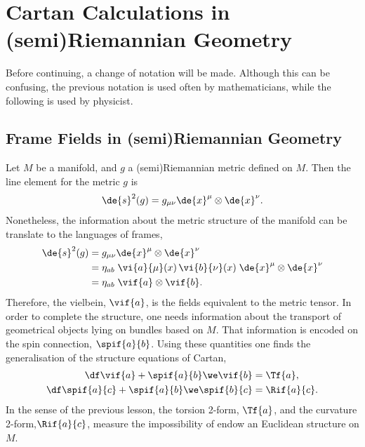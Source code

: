 
\chapter{Cartan Calculations in (semi)Riemannian Geometry}

Before continuing, a change of notation will be made. Although this can be confusing, the previous notation is used often by mathematicians, while the following is used by physicist.

\section{Frame Fields in (semi)Riemannian Geometry}


Let $M$ be a manifold, and $g$ a (semi)Riemannian metric defined on $M$. Then the line element for the metric $g$ is
\begin{align}
  \de{s}^2(g) = g_{\mu\nu} \de{x}^\mu \otimes \de{x}^\nu.
\end{align}
Nonetheless, the information about the metric structure of the manifold can be translate to the languages of frames,
\begin{equation}
  \begin{split}
    \de{s}^2(g)
    &= g_{\mu\nu} \de{x}^\mu \otimes \de{x}^\nu \\
    &= \eta_{ab} \; \vi{a}{\mu}(x) \, \vi{b}{\nu}(x) \; \de{x}^\mu \otimes \de{x}^\nu \\
    &= \eta_{ab} \; \vif{a} \otimes \vif{b}.
  \end{split}
\end{equation}
Therefore, the vielbein, $\vif{a}$, is the fields equivalent to the metric tensor. In order to complete the structure, one needs information about the transport of geometrical objects lying on bundles based on $M$. That information is encoded on the spin connection, $\spif{a}{b}$. Using these quantities one finds  the generalisation of the structure equations of Cartan,
\begin{align}
  \df \vif{a} + \spif{a}{b} \we \vif{b} &= \Tf{a}, \label{firstSE}\\
  \df \spif{a}{c} + \spif{a}{b} \we \spif{b}{c} &= \Rif{a}{c} \label{secondSE}.
\end{align}
In the sense of the previous lesson, the torsion 2-form, $\Tf{a}$, and the curvature 2-form,$\Rif{a}{c}$, measure the impossibility of endow an Euclidean structure on $M$.

